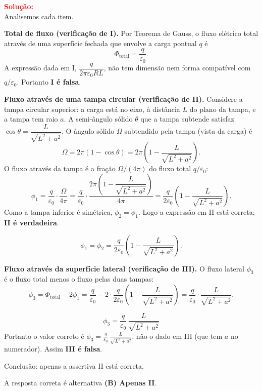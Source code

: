 \documentclass[a4paper,12pt]{article}
\begin{document}
\begin{flushleft}
\vspace{0.5cm}

\textcolor{red}{\textbf{Solução:}}\\

Analisemos cada item.

\textbf{Total de fluxo (verificação de I).} Por Teorema de Gauss, o fluxo elétrico total através de uma superfície fechada que envolve a carga pontual \(q\) é
\[
\Phi_{\text{total}}=\frac{q}{\varepsilon_0}.
\]
A expressão dada em I, \(\dfrac{q}{2\pi\varepsilon_0RL}\), não tem dimensão nem forma compatível com \(q/\varepsilon_0\). Portanto \textbf{I é falsa}.

\textbf{Fluxo através de uma tampa circular (verificação de II).} Considere a tampa circular superior: a carga está no eixo, à distância \(L\) do plano da tampa, e a tampa tem raio \(a\). A semi-ângulo sólido \(\theta\) que a tampa subtende satisfa\-z \(\cos\theta=\dfrac{L}{\sqrt{L^2+a^2}}\). O ângulo sólido \(\Omega\) subtendido pela tampa (vista da carga) é
\[
\Omega = 2\pi(1-\cos\theta)=2\pi\left(1-\frac{L}{\sqrt{L^2+a^2}}\right).
\]
O fluxo através da tampa é a fração \(\Omega/(4\pi)\) do fluxo total \(q/\varepsilon_0\):
\[
\phi_1=\frac{q}{\varepsilon_0}\cdot\frac{\Omega}{4\pi}
=\frac{q}{\varepsilon_0}\cdot\frac{2\pi\left(1-\dfrac{L}{\sqrt{L^2+a^2}}\right)}{4\pi}
=\frac{q}{2\varepsilon_0}\left(1-\frac{L}{\sqrt{L^2+a^2}}\right).
\]
Como a tampa inferior é simétrica, \(\phi_2=\phi_1\). Logo a expressão em II está correta; \textbf{II é verdadeira}.

\[
\boxed{
\phi_1= \phi_2=\frac{q}{2\varepsilon_0}\left(1-\frac{L}{\sqrt{L^2+a^2}}\right).
}
\]

\textbf{Fluxo através da superfície lateral (verificação de III).} O fluxo lateral \(\phi_3\) é o fluxo total menos o fluxo pelas duas tampas:
\[
\phi_3=\Phi_{\text{total}}-2\phi_1
=\frac{q}{\varepsilon_0}-2\cdot\frac{q}{2\varepsilon_0}\left(1-\frac{L}{\sqrt{L^2+a^2}}\right)
=\frac{q}{\varepsilon_0}\cdot\frac{L}{\sqrt{L^2+a^2}}.
\]

\[
\boxed{\phi_3=\frac{q}{\varepsilon_0}\,\frac{L}{\sqrt{L^2+a^2}}}
\]
Portanto o valor correto é \(\displaystyle \phi_3=\frac{q}{\varepsilon_0}\,\frac{L}{\sqrt{L^2+a^2}}\), não o dado em III (que tem \(a\) no numerador). Assim \textbf{III é falsa}.

\vspace{0.3cm}
Conclusão: apenas a assertiva II está correta.

A resposta correta é alternativa \colorbox{green!50}{\textbf{(B) Apenas II}}.

\end{flushleft}
\end{document}
